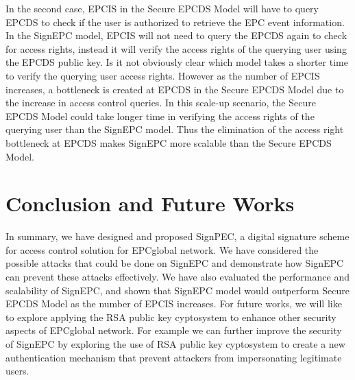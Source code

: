 \documentclass[conference]{IEEEtran}
\begin{document}
In the second case, EPCIS in the Secure EPCDS Model will have to query EPCDS to check if the user is authorized to retrieve the EPC event information. In the SignEPC model, EPCIS will not need to query the EPCDS again to check for access rights, instead it will verify the access rights of the querying user using the EPCDS public key. Is it not obviously clear which model takes a shorter time to verify the querying user access rights. However as the number of EPCIS increases, a bottleneck is created at EPCDS in the Secure EPCDS Model due to the increase in access control queries. In this scale-up scenario, the Secure EPCDS Model could take longer time in verifying the access rights of the querying user than the SignEPC model. Thus the elimination of the access right bottleneck at EPCDS makes SignEPC more scalable than the Secure EPCDS Model. 

\section{Conclusion and Future Works}
\label{sec:conclusion}
In summary, we have designed and proposed SignPEC, a digital signature scheme for access control solution for EPCglobal network. We have considered the possible attacks that could be done on SignEPC and demonstrate how SignEPC can prevent these attacks effectively. We have also evaluated the performance and scalability of SignEPC, and shown that SignEPC model would outperform Secure EPCDS Model as the number of EPCIS increases. For future works, we will like to explore applying the RSA public key cyptosystem to enhance other security aspects of EPCglobal network. For example we can further improve the security of SignEPC by exploring the use of RSA public key cyptosystem to create a new authentication mechanism that prevent attackers from impersonating legitimate users.

 {}

\end{document}
